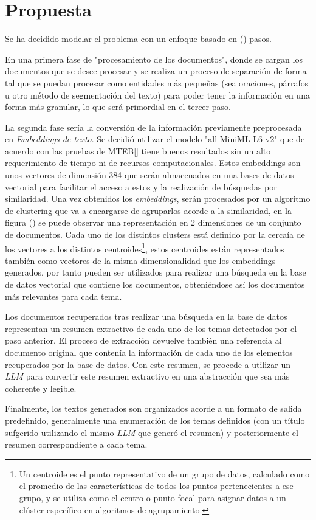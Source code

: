 \chapter{Propuesta}\label{chapter:proposal}
    Se ha decidido modelar el problema con un enfoque basado en () pasos.

    En una primera fase de "procesamiento de los documentos", donde se cargan los documentos que se desee procesar y se realiza un proceso de separación de forma tal que se puedan procesar como entidades más pequeñas (sea oraciones, párrafos u otro método de segmentación del texto) para poder tener la información en una forma más granular, lo que será primordial en el tercer paso.
    
    La segunda fase sería la conversión de la información previamente preprocesada en \emph{Embeddings de texto}. Se decidió utilizar el modelo "all-MiniML-L6-v2" que de acuerdo con las pruebas de MTEB[\cite{leaderboard}] tiene buenos resultados sin un alto requerimiento de tiempo ni de recursos computacionales. Estos embeddings son unos vectores de dimensión 384 que serán almacenados en una bases de datos vectorial para facilitar el acceso a estos y la realización de búsquedas por similaridad.
    Una vez obtenidos los \emph{embeddings}, serán procesados por un algoritmo de clustering que va a encargarse de agruparlos acorde a la similaridad, en la figura () se puede observar una representación en 2 dimensiones de un conjunto de documentos. Cada uno de los distintos clusters está definido por la cercaía de los vectores a los distintos centroides\footnote{Un centroide es el punto representativo de un grupo de datos, calculado como el promedio de las características de todos los puntos pertenecientes a ese grupo, y se utiliza como el centro o punto focal para asignar datos a un clúster específico en algoritmos de agrupamiento.}, estos centroides están representados también como vectores de la misma dimensionalidad que los embeddings generados, por tanto pueden ser utilizados para realizar una búsqueda en la base de datos vectorial que contiene los documentos, obteniéndose así los documentos más relevantes para cada tema.

    Los documentos recuperados tras realizar una búsqueda en la base de datos representan un resumen extractivo de cada uno de los temas detectados por el paso anterior. El proceso de extracción devuelve también una referencia al documento original que contenía la información de cada uno de los elementos recuperados por la base de datos. Con este resumen, se procede a utilizar un \emph{LLM} para convertir este resumen extractivo en una abstracción que sea más coherente y legible.

    Finalmente, los textos generados son organizados acorde a un formato de salida predefinido, generalmente una enumeración de los temas definidos (con un título sufgerido utilizando el mismo \emph{LLM} que generó el resumen) y posteriormente el resumen correspondiente a cada tema.
